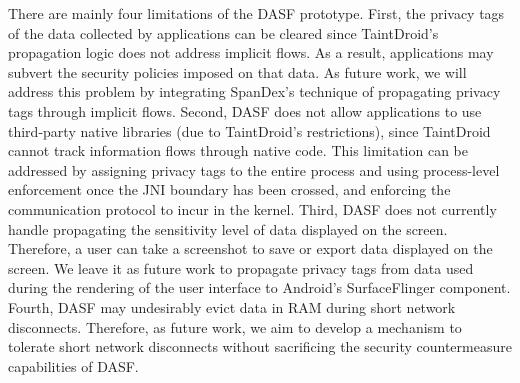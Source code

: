 There are mainly four limitations of the DASF prototype.  First, 
the privacy tags of the data collected by applications can be cleared since
TaintDroid's propagation logic does not address implicit flows. As a result,
applications may subvert the security policies imposed on that data.  As future
work, we will address this problem by integrating SpanDex's\cite{cgl+14}
technique of propagating privacy tags through implicit flows.  Second, DASF
does not allow applications to use third-party native libraries (due to
TaintDroid's restrictions), since TaintDroid cannot track information flows
through native code. This limitation can be addressed by assigning privacy tags
to the entire process and using process-level enforcement once the JNI boundary
has been crossed, and enforcing the communication protocol to incur in the
kernel.  Third, DASF does not currently handle propagating the sensitivity
level of data displayed on the screen. Therefore, a user can take a screenshot
to save or export data displayed on the screen. We leave it as future work to
propagate privacy tags from data used during the rendering of the user
interface to Android's SurfaceFlinger component. Fourth, DASF may undesirably
evict data in RAM during short network disconnects. Therefore, as future work,
we aim to develop a mechanism to tolerate short network disconnects without
sacrificing the security countermeasure capabilities of DASF.









